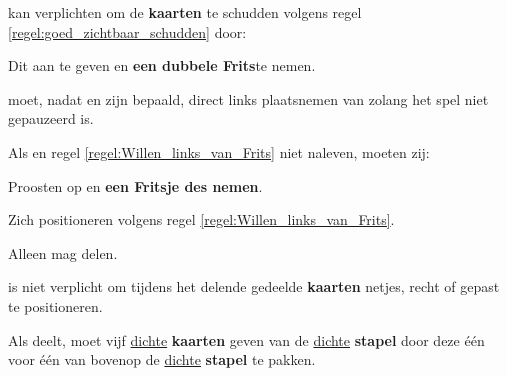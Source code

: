
\vervolgLijst{}
\item \Frits kan \eenSpeler verplichten om de \textbf{kaarten} te schudden volgens regel \ref{regel:goed_zichtbaar_schudden} door:
\puntLijst{}
\item Dit aan te geven en \textbf{een dubbele Frits}\footnotemark[3] te nemen.
\eindPuntLijst{}
\label{regel:verplicht_schudden}
\eindLijst{}


\vervolgLijst{}
\item \Willem moet, nadat \Frits en \Willem zijn bepaald, direct links plaatsnemen van \Frits zolang het spel niet gepauzeerd is.
\label{regel:Willen_links_van_Frits}
\eindLijst{}

\vervolgLijst{}
\item Als \Frits en \Willem regel \ref{regel:Willen_links_van_Frits} niet naleven, moeten zij:
\puntLijst{}
\item Proosten op  en \textbf{een Fritsje des nemen}\footnotemark[2].
\item Zich positioneren volgens regel \ref{regel:Willen_links_van_Frits}.
\eindPuntLijst{}
\eindLijst{}

\footnotetext[2]{\footnoteFritsjeDesNemen}
\footnotetext[3]{\footnoteEenDubbeleFritsNemen}

\newpage
{}
\label{hoofdstuk:beginfase_einde}


\vervolgLijst{}
\item Alleen \Frits mag delen\footnotemark[1].
\label{regel:delen_Frits}
\eindLijst{}

\vervolgLijst{}
\item \Frits is niet verplicht om tijdens het delen\footnotemark[1] de gedeelde \textbf{kaarten} netjes, recht of gepast te positioneren.
\eindLijst{}

\vervolgLijst{}
\item Als \Frits deelt\footnotemark[1], moet \Frits \alleSpelers vijf \ul{dichte} \textbf{kaarten} geven van de \ul{dichte} \textbf{stapel} door deze één voor één van bovenop de \ul{dichte} \textbf{stapel} te pakken.
\label{regel:delen_Frits_5_kaarten_1}
\eindLijst{}

